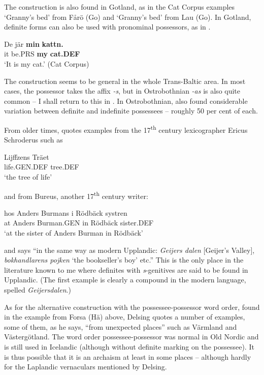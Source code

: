 The construction is also found in Gotland, as in the Cat Corpus examples  ‘Granny’s bed’ from Fårö (Go) and ‘Granny’s bed’ from Lau (Go). In Gotland, definite forms can also be used with pronominal possessors, as in .

\ea\label{}
\gll De  jär  \textbf{min} \textbf{kattn.}\\
it  be.PRS  \textbf{my} \textbf{cat.DEF}\\
\glt  ‘It is my cat.’ (Cat Corpus)
\z

The construction seems to be general in the whole Trans-Baltic area. In most cases, the possessor takes the affix\textit{ {}-s}, but in Ostrobothnian\textit{ {}-as }is also quite common – I shall return to this in . In Ostrobothnian, \citet{ErikssonEtAl} also found considerable variation between definite and indefinite possessees – roughly 50 per cent of each. 

From older times, \citet[523]{Hesselman1908} quotes examples from the 17\textsuperscript{th} century lexicographer Ericus Schroderus such as

\ea\label{}
\gll Lijffzens  Träet\\
life.GEN.DEF  tree.DEF\\
\glt  ‘the tree of life’
\z

and from Bureus, another 17\textsuperscript{th} century writer:


\ea\label{}
\gll hos  Anders  Burmans  i  Rödbäck  systren\\
at  Anders  Burman.GEN  in  Rödbäck  sister.DEF\\
\glt ‘at the sister of Anders Burman in Rödbäck’
\z

and says “in the same way as modern Upplandic: \textit{Geijers dalen }[Geijer’s Valley], \textit{bokhandlarens pojken} ‘the bookseller’s boy’ etc.” This is the only place in the literature known to me where definites with \textit{s}{}-genitives are said to be found in Upplandic. (The first example is clearly a compound in the modern language, spelled \textit{Geijersdalen}.)

As for the alternative construction with the possessee-possessor word order, found in the example from Forsa (Hä) above, Delsing quotes a number of examples, some of them, as he says, “from unexpected places” such as Värmland and Västergötland. The word order possessee-possessor was normal in Old Nordic and is still used in Icelandic (although without definite marking on the possessee). It is thus possible that it is an archaism at least in some places – although hardly for the Laplandic vernaculars mentioned by Delsing.

